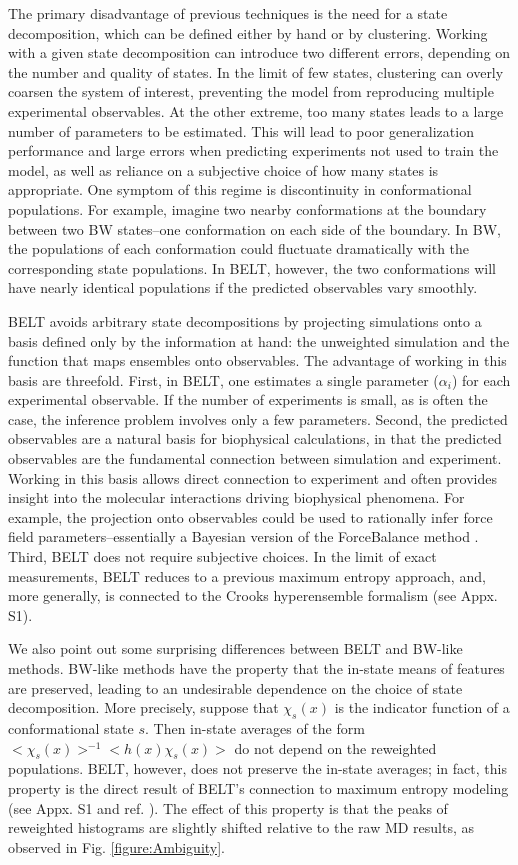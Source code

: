 \documentclass[journal=jacsat,manuscript=article]{achemso}
\begin{document}
The primary disadvantage of previous techniques is the need for a state decomposition, which can be defined either by hand or by clustering.  Working with a given state decomposition can introduce two different errors, depending on the number  and quality of states.  In the limit of few states, clustering can overly coarsen the system of interest, preventing the model from reproducing multiple experimental observables.  At the other extreme, too many states leads to a large number of parameters to be estimated. This will lead to poor generalization performance and large errors when predicting experiments not used to train the model, as well as reliance on a subjective choice of how many states is appropriate.  One symptom of this regime is discontinuity in conformational populations. For example, imagine two nearby conformations at the boundary between two BW states--one conformation on each side of the boundary.  In BW, the populations of each conformation could fluctuate dramatically with the 
corresponding state populations.  In BELT, however, the two conformations will have nearly identical populations if the predicted observables vary smoothly.

BELT avoids arbitrary state decompositions by projecting simulations onto a basis defined only by the information at hand: the unweighted simulation and the function that maps ensembles onto observables.  The advantage of working in this basis are threefold. First, in BELT, one estimates a single parameter ($\alpha_i$) for each experimental observable.  If the number of experiments is small, as is often the case, the inference problem involves only a few parameters.  Second, the predicted observables are a natural basis for biophysical calculations, in that the predicted observables are the fundamental connection between simulation and experiment.  Working in this basis allows direct connection to experiment and often provides insight into the molecular interactions driving biophysical phenomena.  For example, the projection onto observables could be used to rationally infer force field parameters--essentially a Bayesian version of the ForceBalance method  \cite{wang2012, wang2013systematic}.  Third, BELT 
does not require subjective choices.  In the limit of exact measurements, BELT reduces to a previous  \cite{chodera2012} maximum entropy approach, and, more generally, is connected to the Crooks hyperensemble formalism (see Appx. S1).  

We also point out some surprising differences between BELT and BW-like methods.  BW-like methods have the property that the in-state means of features are preserved, leading to an undesirable dependence on the choice of state decomposition.  More precisely, suppose that $\chi_s(x)$ is the indicator function of a conformational state $s$.  Then in-state averages of the form $<\chi_s(x)>^{-1} <h(x) \chi_s(x)>$ do not depend on the reweighted populations.  BELT, however, does not preserve the in-state averages; in fact, this property is the direct result of BELT's connection to maximum entropy modeling (see Appx. S1 and ref.  \cite{chodera2012}).  The effect of this property is that the peaks of reweighted histograms are slightly shifted relative to the raw MD results, as observed in Fig. \ref{figure:Ambiguity}.   
\end{document}
